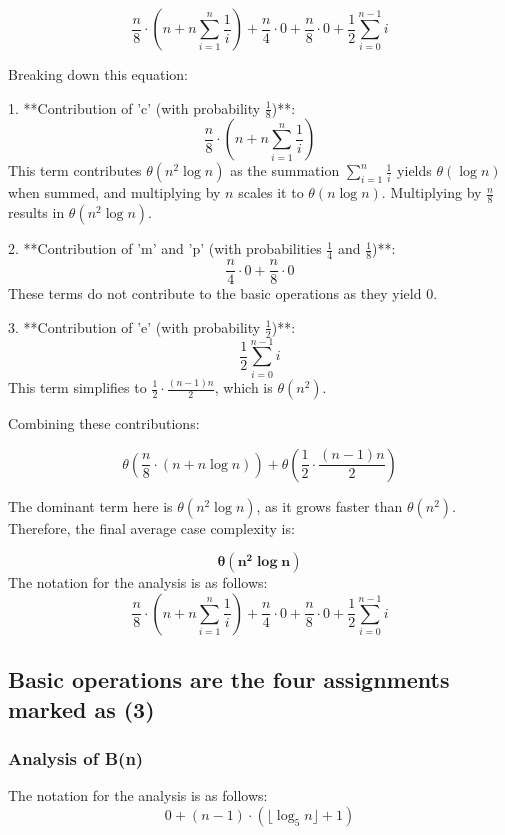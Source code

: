 \documentclass[11pt, oneside, a4paper]{article}
\begin{document}
\begin{equation*}
\frac{n}{8} \cdot \left( n + n \sum_{i=1}^{n} \frac{1}{i} \right) + \frac{n}{4} \cdot 0 + \frac{n}{8} \cdot 0 + \frac{1}{2} \sum_{i=0}^{n-1} i
\end{equation*}

Breaking down this equation:

1. **Contribution of 'c' (with probability \(\frac{1}{8}\))**:
   \[
   \frac{n}{8} \cdot \left( n + n \sum_{i=1}^{n} \frac{1}{i} \right)
   \]
   This term contributes \(\theta(n^2 \log n)\) as the summation \(\sum_{i=1}^{n} \frac{1}{i}\) yields \(\theta(\log n)\) when summed, and multiplying by \( n \) scales it to \(\theta(n \log n)\). Multiplying by \( \frac{n}{8} \) results in \(\theta(n^2 \log n)\).

2. **Contribution of 'm' and 'p' (with probabilities \(\frac{1}{4}\) and \(\frac{1}{8}\))**:
   \[
   \frac{n}{4} \cdot 0 + \frac{n}{8} \cdot 0
   \]
   These terms do not contribute to the basic operations as they yield 0.

3. **Contribution of 'e' (with probability \(\frac{1}{2}\))**:
   \[
   \frac{1}{2} \sum_{i=0}^{n-1} i
   \]
   This term simplifies to \(\frac{1}{2} \cdot \frac{(n-1)n}{2}\), which is \(\theta(n^2)\).

Combining these contributions:

\[
\theta\left(\frac{n}{8} \cdot (n + n \log n)\right) + \theta\left(\frac{1}{2} \cdot \frac{(n-1)n}{2}\right)
\]

The dominant term here is \(\theta(n^2 \log n)\), as it grows faster than \(\theta(n^2)\). Therefore, the final average case complexity is:

\[
\boldsymbol{\theta(n^2 \log n)}
\]
\noindent The notation for the analysis is as follows:
\begin{equation*}
\frac{n}{8} \cdot \left( n + n \sum_{i=1}^{n} \frac{1}{i} \right) + \frac{n}{4} \cdot 0 + \frac{n}{8} \cdot 0 + \frac{1}{2} \sum_{i=0}^{n-1} i
\end{equation*}

	\subsection{Basic operations are the four assignments marked as (3)}

	\subsubsection{Analysis of B(n)}
\noindent The notation for the analysis is as follows:
\begin{equation*}
0 + (n-1) \cdot \left( \lfloor \log_5 n \rfloor + 1 \right)
\end{equation*}
\end{document}
